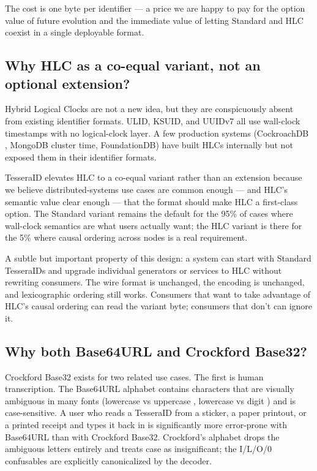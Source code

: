 The cost is one byte per identifier --- a price we are happy to pay for the option value of future evolution and the immediate value of letting Standard and HLC coexist in a single deployable format.

\subsection{Why HLC as a co-equal variant, not an optional extension?}

Hybrid Logical Clocks \citep{kulkarni2014hlc} are not a new idea, but they are conspicuously absent from existing identifier formats. ULID, KSUID, and UUIDv7 all use wall-clock timestamps with no logical-clock layer. A few production systems (CockroachDB \citep{cockroachdb_hlc}, MongoDB cluster time, FoundationDB) have built HLCs internally but not exposed them in their identifier formats.

TesseraID elevates HLC to a co-equal variant rather than an extension because we believe distributed-systems use cases are common enough --- and HLC's semantic value clear enough --- that the format should make HLC a first-class option. The Standard variant remains the default for the 95\% of cases where wall-clock semantics are what users actually want; the HLC variant is there for the 5\% where causal ordering across nodes is a real requirement.

A subtle but important property of this design: a system can start with Standard TesseraIDs and upgrade individual generators or services to HLC without rewriting consumers. The wire format is unchanged, the encoding is unchanged, and lexicographic ordering still works. Consumers that want to take advantage of HLC's causal ordering can read the variant byte; consumers that don't can ignore it.

\subsection{Why both Base64URL and Crockford Base32?}

Crockford Base32 exists for two related use cases. The first is human transcription. The Base64URL alphabet contains characters that are visually ambiguous in many fonts (lowercase  vs uppercase , lowercase  vs digit ) and is case-sensitive. A user who reads a TesseraID from a sticker, a paper printout, or a printed receipt and types it back in is significantly more error-prone with Base64URL than with Crockford Base32. Crockford's alphabet drops the ambiguous letters entirely and treats case as insignificant; the I/L/O/0 confusables are explicitly canonicalized by the decoder.

